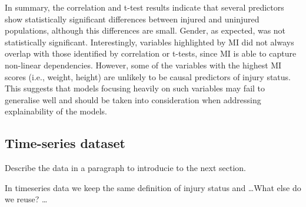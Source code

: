 In summary, the correlation and t-test results indicate that several predictors show statistically significant differences between injured and uninjured populations, although this differences are small. Gender, as expected, was not statistically significant. Interestingly, variables highlighted by MI did not always overlap with those identified by correlation or t-tests, since MI is able to capture non-linear dependencies. However, some of the variables with the highest MI scores (i.e., weight, height) are unlikely to be causal predictors of injury status. This suggests that models focusing heavily on such variables may fail to generalise well and should be taken into consideration when addressing explainability of the models.




\subsection{Time-series dataset}\label{subsec:method-ts-dataset}

Describe the data in a paragraph to introducie to the next section.







In timeseries data we keep the same definition of injury status and \dots What else do we reuse? \dots

